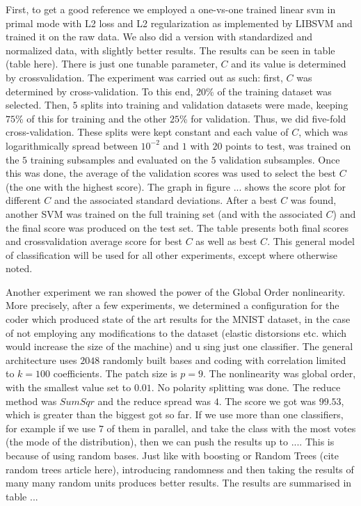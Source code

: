 \documentclass[12pt,a4paper,oneside,english]{UPBThesis}
\begin{document}
First, to get a good reference we employed a one-vs-one trained linear svm in primal mode with L2 loss and L2 regularization as implemented by LIBSVM and trained it on the raw data. We also did a version with standardized and normalized data, with slightly better results. The results can be seen in table (table here). There is just one tunable parameter, $C$ and its value is determined by crossvalidation. The experiment was carried out as such: first, $C$ was determined by cross-validation. To this end, $20$\% of the training dataset was selected. Then, $5$ splits into training and validation datasets were made, keeping $75$\% of this for training and the other $25$\% for validation. Thus, we did five-fold cross-validation. These splits were kept constant and each value of $C$, which was logarithmically spread between $10^{-2}$ and $1$ with $20$ points to test, was trained on the $5$ training subsamples and evaluated on the $5$ validation subsamples. Once this was done, the average of the validation scores was used to select the best $C$ (the one with the highest score). The graph in figure ... shows the score plot for different $C$ and the associated standard deviations. After a best $C$ was found, another SVM was trained on the full training set (and with the associated $C$) and the final score was produced on the test set. The table presents both final scores and crossvalidation average score for best $C$ as well as best $C$. This general model of classification will be used for all other experiments, except where otherwise noted.

Another experiment we ran showed the power of the Global Order nonlinearity. More precisely, after a few experiments, we determined a configuration for the coder which produced state of the art results for the MNIST dataset, in the case of not employing any modifications to the dataset (elastic distorsions etc. which would increase the size of the machine) and u sing just one classifier. The general architecture uses $2048$ randomly built bases and coding with correlation limited to $k=100$ coefficients. The patch size is $p=9$. The nonlinearity was global order, with the smallest value set to $0.01$. No polarity splitting was done. The reduce method was $SumSqr$ and the reduce spread was $4$. The score we got was $99.53$, which is greater than the biggest got so far. If we use more than one classifiers, for example if we use $7$ of them in parallel, and take the class with the most votes (the mode of the distribution), then we can push the results up to .... This is because of using random bases. Just like with boosting or Random Trees (cite random trees article here), introducing randomness and then taking the results of many many random units produces better results. The results are summarised in table ...
\end{document}
